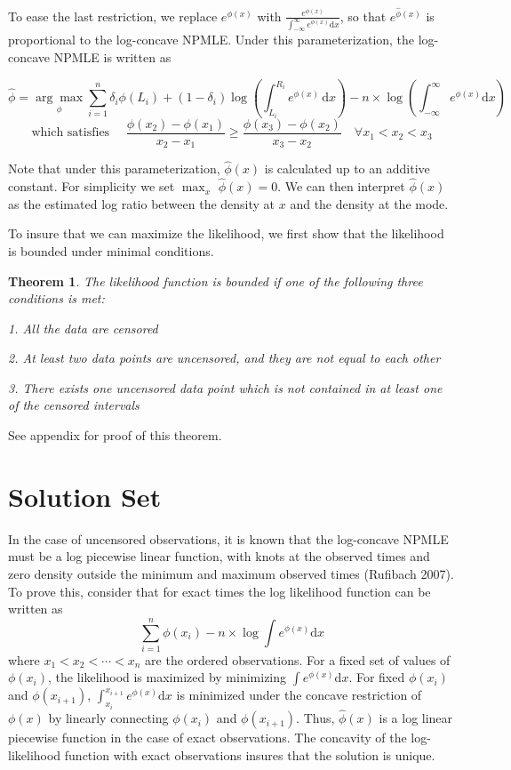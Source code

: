 \documentclass[10pt]{article}
\newtheorem{thm}{Theorem}
\begin{document}
	To ease the last restriction, we replace $e^{\phi(x)}$ with $\frac{e^{\phi(x)} } { \int_{-\infty}^{\infty}  e^{\phi(x)} \mathrm{d}x}$, so that $e^{\hat \phi(x)}$ is proportional to the log-concave NPMLE. Under this parameterization, the log-concave NPMLE is written as 

	\[ \hat \phi =\underset{\phi} {\arg \max} \displaystyle \sum_{i = 1}^n \delta_i \phi(L_i)   + (1 - \delta_i) \log \left( \int_{L_i}^{R_i} e^ { \phi(x) } \,\mathrm{d}x \right) - n \times \log \left(  \int_{-\infty}^{\infty} e^ { \phi(x) } \mathrm{d}x \right) 
	\]
	\[
	 \text{which satisfies } \quad \frac{ \phi(x_2) - \phi(x_1)} {x_2 - x_1} \geq \frac{ \phi(x_3) - \phi(x_2)} {x_3 - x_2}\quad \forall x_1 < x_2 < x_3 
	 \]
	
	Note that under this parameterization, $\hat \phi(x)$ is calculated up to an additive constant. For simplicity we set $\max_x $ $\hat \phi(x) = 0$. We can then interpret $\hat \phi(x)$ as the estimated log ratio between the density at $x$ and the density at the mode.

	To insure that we can maximize the likelihood, we first show that the likelihood is bounded under minimal conditions.	
	
		\begin{thm}
	\label{thm1}
	The likelihood function is bounded if one of the following three conditions is met:
	
	1. All the data are censored
	
	2. At least two data points are uncensored, and they are not equal to each other
	
	3. There exists one uncensored data point which is not contained in at least one of the censored intervals
	
	
	\end{thm}
	
	See appendix for proof of this theorem. 	
		
{\section{Solution Set}}


	In the case of uncensored observations, it is known that the log-concave NPMLE must be a log piecewise linear function, with knots at the observed times and zero density outside the minimum and maximum observed times (Rufibach 2007). To prove this, consider that for exact times the log likelihood function can be written as	
	\[ \displaystyle \sum_{i = 1}^n \phi(x_i) - n \times \log \int e^{\phi(x)} \mathrm{d}x
	\]
where $x_1<x_2<\cdots<x_n$ are the ordered observations. For a fixed set of values of $\phi(x_i)$, the likelihood is maximized by minimizing $\int e^{\phi(x)} \mathrm{d}x$. For fixed $\phi(x_i)$ and $\phi(x_{i+1})$, $\int_{x_i}^{x_{i+1}} e^{\phi(x)}\mathrm{d}x$ is minimized under the concave restriction of $\phi(x)$ by linearly connecting $\phi(x_i)$ and $\phi(x_{i+1})$. Thus, $\hat \phi(x)$ is a log linear piecewise function in the case of exact observations. The concavity of the log-likelihood function with exact observations insures that the solution is unique.
		
\end{document}
